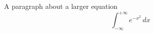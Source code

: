 \documentclass{article}
\begin{document}
A paragraph about a larger equation
\[
\int_{-\infty}^{+\infty} e^{-x^2} \, dx
\]
\end{document}
